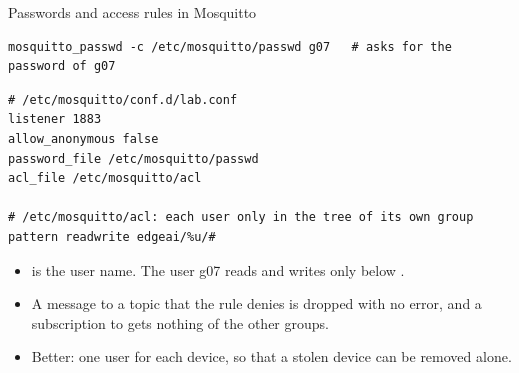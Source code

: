 \begin{frame}[fragile]{Passwords and access rules in Mosquitto}
\begin{lstlisting}[style=shell]
mosquitto_passwd -c /etc/mosquitto/passwd g07   # asks for the password of g07
\end{lstlisting}
\begin{lstlisting}[basicstyle=\ttfamily\scriptsize]
# /etc/mosquitto/conf.d/lab.conf
listener 1883
allow_anonymous false
password_file /etc/mosquitto/passwd
acl_file /etc/mosquitto/acl

# /etc/mosquitto/acl: each user only in the tree of its own group
pattern readwrite edgeai/%u/#
\end{lstlisting}
  \small
  \begin{itemize}
    \item {} is the user name. The user g07 reads and writes only
          below .
    \item A message to a topic that the rule denies is dropped with no
          error, and a subscription to \code{\#} gets nothing of the other
          groups.
    \item Better: one user for each device, so that a stolen device can be
          removed alone.
  \end{itemize}
\end{frame}


